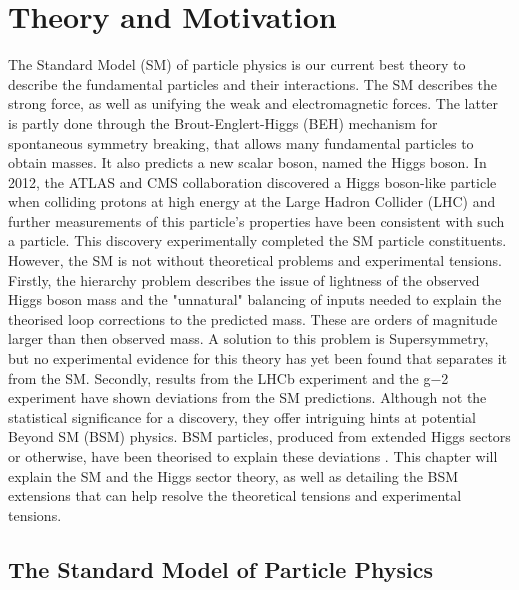 \chapter{Theory and Motivation}

The Standard Model (SM) of particle physics is our current best theory to describe the fundamental particles and their interactions.
The SM describes the strong force, as well as unifying the weak and electromagnetic forces.
The latter is partly done through the Brout-Englert-Higgs (BEH) mechanism for spontaneous symmetry breaking, that allows many fundamental particles to obtain masses.
It also predicts a new scalar boson, named the Higgs boson.
In 2012, the ATLAS \cite{ATLAS_Higgs_Discovery} and CMS collaboration \cite{CMS_Higgs_Discovery} discovered a Higgs boson-like particle when colliding protons at high energy at the Large Hadron Collider (LHC) and further measurements of this particle's properties have been consistent with such a particle.
This discovery experimentally completed the SM particle constituents. \\

However, the SM is not without theoretical problems and experimental tensions.
Firstly, the hierarchy problem describes the issue of lightness of the observed Higgs boson mass and the "unnatural" balancing of inputs needed to explain the theorised loop corrections to the predicted mass. 
These are orders of magnitude larger than then observed mass.
A solution to this problem is Supersymmetry, but no experimental evidence for this theory has yet been found that separates it from the SM. 
Secondly, results from the LHCb experiment \cite{LHCb:2021trn,Kowalewski:2013mna,BaBar:2013mob,Belle:2015qfa,LHCb:2015gmp,Belle:2016dyj,LHCb:2017rln,LHCb:2017smo} and the g−2 experiment \cite{Muong-2:2021ojo} have shown deviations from the SM predictions.
Although not the statistical significance for a discovery, they offer intriguing hints at potential Beyond SM (BSM) physics.
BSM particles, produced from extended Higgs sectors or otherwise, have been theorised to explain these deviations .
This chapter will explain the SM and the Higgs sector theory, as well as detailing the BSM extensions that can help resolve the theoretical tensions and experimental tensions.

\section{The Standard Model of Particle Physics}

